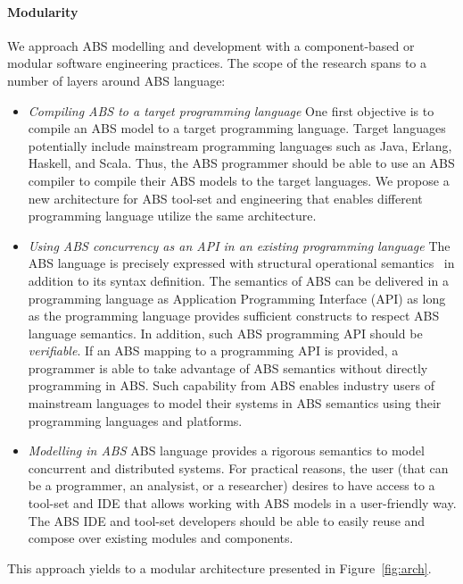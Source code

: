 \paragraph{Modularity} 
We approach ABS modelling and development with a component-based or modular 
software engineering practices.
The scope of the research spans to a number of layers around ABS language:

\begin{itemize}
\item \emph{Compiling ABS to a target programming language}
One first objective is to compile an ABS model to a target programming language.
Target languages potentially include mainstream programming languages such as
Java, Erlang, Haskell, and Scala.
Thus, the ABS programmer should be able to use an ABS compiler to compile
their ABS models to the target languages.
We propose a new architecture for ABS tool-set and engineering that enables
different programming language utilize the same architecture.
\item \emph{Using ABS concurrency as an API in an existing programming language}
The ABS language is precisely expressed with structural operational semantics~\cite{johnsen2012abs} in addition to its syntax definition.
The semantics of ABS can be delivered in a programming language
as Application Programming Interface (API) as long as the programming language provides sufficient constructs to respect ABS language semantics.
In addition, such ABS programming API should be \emph{verifiable}.
If an ABS mapping to a programming API is provided, a programmer is able to
take advantage of ABS semantics without directly programming in ABS.
Such capability from ABS enables industry users of mainstream languages to
model their systems in ABS semantics using their programming languages and
platforms.
\item \emph{Modelling in ABS}
ABS language provides a rigorous semantics to model concurrent
and distributed systems.
For practical reasons, the user (that can be a programmer, an analysist, or a researcher) 
desires to have access to a tool-set and IDE that allows working with ABS 
models in a user-friendly way.
The ABS IDE and tool-set developers should be able to easily reuse and compose
over existing modules and components.
\end{itemize}

This approach yields to a modular architecture presented in 
Figure~\ref{fig:arch}.



